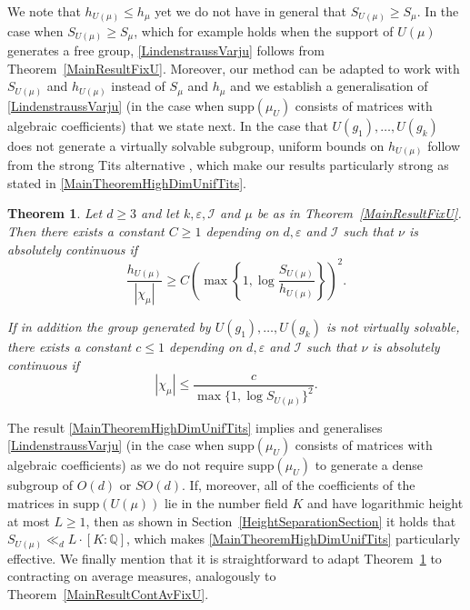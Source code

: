 \documentclass[10pt, english,oneside,reqno]{amsart}
\theoremstyle{plain}
\newtheorem{theorem}{Theorem}[section]
\theoremstyle{remark}
\numberwithin{equation}{section}
\numberwithin{figure}{section}
\newcommand{\eps}{\varepsilon}
\newcommand{\Q}{\mathbb{Q}}
\begin{document}
    We note that $h_{U(\mu)} \leq h_{\mu}$ yet we do not have in general that $S_{U(\mu)} \geq S_{\mu}$. In the case when $S_{U(\mu)} \geq S_{\mu}$, which for example holds when the support of $U(\mu)$ generates a free group, \eqref{LindenstraussVarju} follows from Theorem~\ref{MainResultFixU}. Moreover, our method can be adapted to work with $S_{U(\mu)}$ and $h_{U(\mu)}$ instead of $S_{\mu}$ and $h_{\mu}$ and we establish a generalisation of \eqref{LindenstraussVarju} (in the case when $\mathrm{supp}(\mu_U)$ consists of matrices with algebraic coefficients) that we state next. In the case that $U(g_1), \ldots , U(g_k)$ does not generate a virtually solvable subgroup, uniform bounds on $h_{U(\mu)}$ follow from the strong Tits alternative \cite{Breuillard2008}, which make our results particularly strong as stated in \eqref{MainTheoremHighDimUnifTits}.
    

    \begin{theorem}\label{MainTheoremHighDim}
        Let $d \geq 3$ and let $k, \eps, \mathcal{I}$ and $\mu$ be as in Theorem~\ref{MainResultFixU}. Then there exists a constant $C \geq 1$ depending on $d,\eps$ and $\mathcal{I}$ such that $\nu$ is absolutely continuous if 
        \begin{equation}\label{Eq:MainTheoremHighDim}
            \frac{h_{U(\mu)}}{|\chi_{\mu}|} \geq C\left( \max\left\{  1,\log \frac{S_{U(\mu)}}{h_{U(\mu)}} \right\} \right)^2.
        \end{equation}
    
        If in addition the group generated by $U(g_1), \ldots , U(g_k)$ is not virtually solvable, there exists a constant $c\leq 1$ depending on $d,\eps$ and $\mathcal{I}$ such that $\nu$ is absolutely continuous if
        \begin{equation}\label{MainTheoremHighDimUnifTits}
            |\chi_{\mu}| \leq \frac{c}{\max\{  1, \log S_{U(\mu)}  \}^2}.
        \end{equation}
    \end{theorem}

    The result \eqref{MainTheoremHighDimUnifTits} implies and generalises \eqref{LindenstraussVarju} (in the case when $\mathrm{supp}(\mu_U)$ consists of matrices with algebraic coefficients) as we do not require $\mathrm{supp}(\mu_U)$ to generate a dense subgroup of $O(d)$ or $SO(d)$. If, moreover, all of the coefficients of the matrices in $\mathrm{supp}(U(\mu))$ lie in the number field $K$ and have logarithmic height at most $L \geq 1$, then as shown in Section~\ref{HeightSeparationSection} it holds that $S_{U(\mu)} \ll_d L\cdot[K:\Q]$, which makes \eqref{MainTheoremHighDimUnifTits} particularly effective. We finally mention that it is straightforward to adapt Theorem~\ref{MainTheoremHighDim} to contracting on average measures, analogously to Theorem~\ref{MainResultContAvFixU}.
\end{document}
